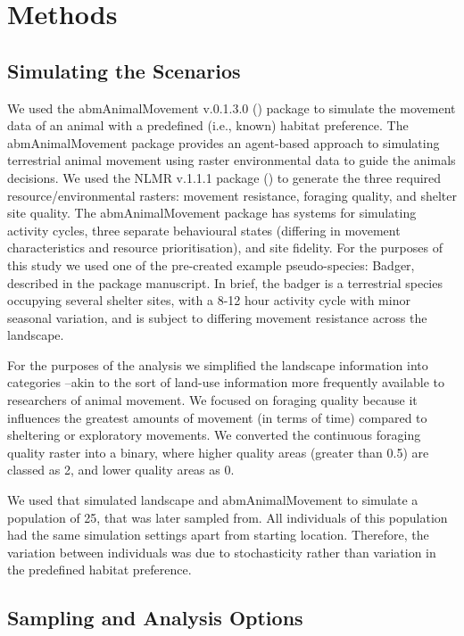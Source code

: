 \documentclass[10pt,a4paper]{article}
\begin{document}
\section{Methods}\label{methods}

\subsection{Simulating the Scenarios}\label{simulating-the-scenarios}

We used the abmAnimalMovement v.0.1.3.0 () package to simulate the movement data of an animal with a predefined (i.e., known) habitat preference.
The abmAnimalMovement package provides an agent-based approach to simulating terrestrial animal movement using raster environmental data to guide the animals decisions.
We used the NLMR v.1.1.1 package () to generate the three required resource/environmental rasters: movement resistance, foraging quality, and shelter site quality.
The abmAnimalMovement package has systems for simulating activity cycles, three separate behavioural states (differing in movement characteristics and resource prioritisation), and site fidelity.
For the purposes of this study we used one of the pre-created example pseudo-species: Badger, described in the package manuscript.
In brief, the badger is a terrestrial species occupying several shelter sites, with a 8-12 hour activity cycle with minor seasonal variation, and is subject to differing movement resistance across the landscape.

For the purposes of the analysis we simplified the landscape information into categories --akin to the sort of land-use information more frequently available to researchers of animal movement.
We focused on foraging quality because it influences the greatest amounts of movement (in terms of time) compared to sheltering or exploratory movements.
We converted the continuous foraging quality raster into a binary, where higher quality areas (greater than 0.5) are classed as 2, and lower quality areas as 0.

We used that simulated landscape and abmAnimalMovement to simulate a population of 25, that was later sampled from.
All individuals of this population had the same simulation settings apart from starting location.
Therefore, the variation between individuals was due to stochasticity rather than variation in the predefined habitat preference.

\subsection{Sampling and Analysis Options}\label{sampling-and-analysis-options}
\end{document}
